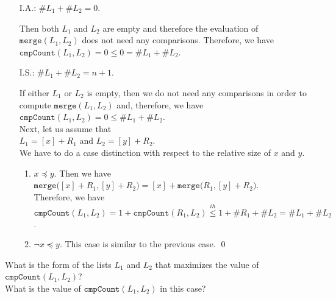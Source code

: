 \begin{enumerate}
\item[I.A.:] $\#L_1 + \#L_2=0$.

             Then both $L_1$ and $L_2$ are empty and therefore the evaluation of
             $\mathtt{merge}(L_1, L_2)$ does not need any comparisons.  Therefore, we have 
             \\[0.2cm]
             \hspace*{1.3cm}
             $\mathtt{cmpCount}(L_1, L_2) = 0 \leq 0 = \#L_1 + \#L_2$.
\item[I.S.:] $\#L_1 + \#L_2 = n+1$.

             If either $L_1$ or $L_2$ is empty, then we do not need any comparisons in order to
             compute $\mathtt{merge}(L_1, L_2)$ and, therefore, we have
             \\[0.2cm]
             \hspace*{1.3cm}
             $\mathtt{cmpCount}(L_1,L_2) = 0 \leq \#L_1 + \#L_2$.
             \\[0.2cm]
             Next, let us assume that \\[0.2cm]
             \hspace*{1.3cm} $L_1 = [x] + R_1$ \quad and \quad $L_2 = [y] + R_2$.
             \\[0.2cm]
             We have to do a case distinction with respect to the relative size of $x$ and $y$.
             \begin{enumerate}
             \item $x \preceq y$.  Then we have \\[0.2cm]
                   \hspace*{1.3cm} 
                   $\mathtt{merge}\bigl([x] + R_1, [y] + R_2\bigr) = [x] + \mathtt{merge}\bigl(R_1, [y] + R_2\bigr)$. 
                   \\[0.2cm]
                   Therefore, we have \\
                   $\mathtt{cmpCount}(L_1, L_2) = 1 + \mathtt{cmpCount}(R_1, L_2) \stackrel{ih}{\leq} 1 + \#R_1 + \#L_2 = \#L_1 + \#L_2$.
             \item $\neg x \preceq y$.  This case is similar to the previous case. 
                   \qed
             \end{enumerate}
\end{enumerate}
\exercise
What is the form of the lists $L_1$ and $L_2$ that maximizes the value of 
\\[0.2cm]
\hspace*{1.3cm}
$\mathtt{cmpCount}(L_1, L_2)$?
\\[0.2cm]
What is the value of $\mathtt{cmpCount}(L_1, L_2)$ in this case? \eox
\vspace*{0.3cm}

